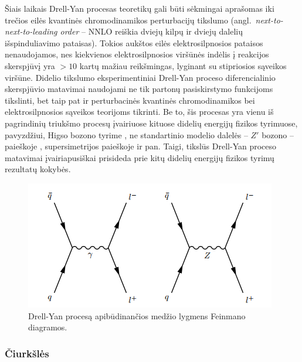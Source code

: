 \documentclass[a4paper, 12pt, oneside]{article}
\begin{document}
Šiais laikais Drell-Yan procesas teoretikų gali būti sėkmingai aprašomas iki trečios eilės kvantinės chromodinamikos
perturbacijų tikslumo (angl.\ \textit{next-to-next-to-leading order} -- NNLO reiškia dviejų kilpų ir dviejų
dalelių išspinduliavimo pataisas).
Tokios aukštos eilės elektrosilpnosios pataisos nenaudojamos, nes kiekvienos elektrosilpnosios viršūnės
indėlis į reakcijos skerspjūvį yra $>10$ kartų mažiau reikšmingas, lyginant su stipriosios sąveikos viršūne.
Didelio tikslumo eksperimentiniai Drell-Yan proceso diferencialinio skerspjūvio matavimai \cite{DY2013, DY7TeVatlas, DY2015, DY8TeVatlas, DY2019}
naudojami ne tik partonų pasiskirstymo funkcijoms tikslinti, bet taip pat ir perturbacinės kvantinės
chromodinamikos bei elektrosilpnosios sąveikos teorijoms tikrinti.
Be to, šis procesas yra vienu iš pagrindinių triukšmo procesų įvairiuose kituose didelių energijų fizikos tyrimuose,
pavyzdžiui, Higso bozono tyrime \cite{Higgs2018}, ne standartinio modelio dalelės -- $Z'$ bozono -- paieškoje \cite{Zprime},
supersimetrijos paieškoje \cite{SUSYtau} ir pan.
Taigi, tikslūs Drell-Yan proceso matavimai įvairiapusiškai prisideda prie kitų didelių energijų
fizikos tyrimų rezultatų kokybės.

\begin{figure}[H]
\centering
\includegraphics[scale=0.75]{DYprocess.PNG}
\caption{Drell-Yan procesą apibūdinančios medžio lygmens Feinmano diagramos.}
\label{fig:DYfeyn}
\end{figure}

\subsubsection{Čiurkšlės}
\end{document}

